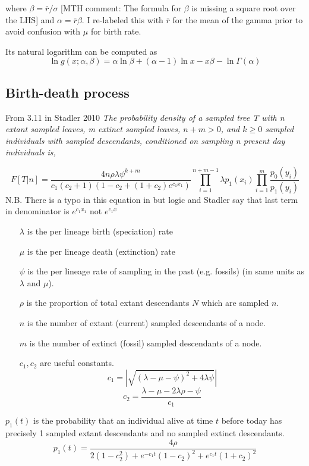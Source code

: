\documentclass{llncs}
\newcommand{\ejmcomment}[1]{{\color{green} #1}}
\newcommand{\mthcomment}[1]{{[\color{red}MTH comment: #1]}}
\begin{document}
where $\beta = \bar{r} / \sigma$ \mthcomment{The formula for $\beta$ is missing a square root over the LHS} and $\alpha = \bar{r} \beta$.
\ejmcomment{I re-labeled this with $\bar{r}$ for the mean of the gamma prior to avoid confusion with $\mu$ for birth rate.}

Its natural logarithm can be computed as
$$ \ln g(x;\alpha,\beta) = \alpha\ln\beta + (\alpha-1)\ln x -x\beta - \ln\Gamma(\alpha) $$

\subsection{Birth-death process}
From 3.11 in Stadler 2010 \textit{The probability density of a sampled tree T with n
extant sampled leaves, m extinct sampled leaves, $n+m > 0$, and $k \geq 0$
sampled individuals with sampled descendants, conditioned on
sampling n present day individuals is,}

$$F[T|n] = \frac{4n\rho\lambda\psi^{k+m}}{c_1(c_2+1)(1-c_2+(1+c_2)e^{c_1x_1})}\prod_{i=1}^{n+m-1}\lambda p_1(x_i)\prod_{i=1}^{m}\frac{p_0(y_i)}{p_1(y_i)}$$
N.B. There is a typo in this equation in \cite{Stadler2010} but logic and Stadler say that last term in denominator is $e^{c_1x_1}$ not  $e^{c_1x}$ \\

\begin{enumerate}
\item[$\lambda$]  is the per lineage birth (speciation) rate
\item[$\mu$]  is the per lineage death (extinction) rate
\item[$\psi$]  is the per lineage rate of sampling in the past (e.g. fossils) (in same units as $\lambda$ and $\mu$).
\item[$\rho$ ] is the proportion of total extant descendants $N$ which are sampled $n$.
\item[$n$] is the number of extant (current) sampled descendants of a node.
\item[$m$] is the number of extinct (fossil) sampled descendants of a node.
\item[$c_1,c_2$]  are useful constants.
$$c_1 = |\sqrt{(\lambda-\mu-\psi)^2 + 4\lambda\psi}|$$
$$c_2 = \frac{\lambda-\mu-2\lambda\rho-\psi}{c_1}$$
\end{enumerate}

$p_1(t)$ is the probability that an individual alive at time $t$ before today has precisely 1 sampled extant descendants and no sampled extinct descendants.
$${p_1}(t) = \frac{4\rho}{2(1-c_2^2)+e^{-c_1t}(1-c_2)^2+e^{c_1t}(1+c_2)^2}$$
\end{document}
